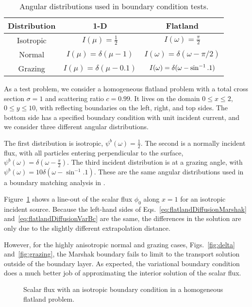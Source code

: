 \begin{table}[htb]
  \centering
  \begin{tabular}{ccc}
\toprule
    Distribution & 1-D & Flatland
\\ \midrule
Isotropic & $I(\mu) = \frac{1}{2}$ & $I(\omega) = \frac{\pi}{2}$
\\
Normal & $I(\mu) = \delta(\mu-1)$ & $I(\omega) = \delta(\omega-\pi/2)$
\\
Grazing & $I(\mu) = \delta(\mu-0.1)$ & $I(\omega) = \delta(\omega-\sin^{-1}.1)$
\\ \bottomrule
  \end{tabular}
  \caption{Angular distributions used in boundary condition tests.}
  \label{tab:angularDistributions}
\end{table}

As a test problem, we consider a homogeneous flatland problem with a
total cross section $\sigma=1$ and scattering ratio $c=0.99$. It lives on the
domain $0 \le x \le 2$, $0 \le y \le 10$, with reflecting boundaries on the left,
right, and top sides. The bottom side has a specified boundary
condition with unit incident current, and we consider three different angular
distributions.

The first distribution is isotropic, $\psi^b(\omega) = \frac{1}{2}$. The second
is a normally incident flux, with all particles entering
perpendicular to the surface, $\psi^b(\omega) = \delta(\omega -
\frac{\pi}{2})$. The third incident distribution is at a grazing angle, with 
$\psi^b(\omega) = 10 \delta(\omega - \sin^{-1}.1)$.
These are the same angular distributions used in a boundary matching analysis
in \cite{Dav2006}.

Figure~\ref{fig:isotropic} shows a line-out of the scalar flux $\phi_0$ along
$x=1$ for an isotropic incident source. Because the left-hand sides of
Eqs.~\eqref{eq:flatlandDiffusionMarshak} and~\eqref{eq:flatlandDiffusionVarBc} are the same, the
differences in the solution are only due to the slightly different
extrapolation distance.

However, for the highly anisotropic normal and grazing cases,
Figs.~\ref{fig:delta} and~\ref{fig:grazing}, the Marshak boundary fails to
limit to the transport solution outside of the boundary layer. As
expected, the variational boundary condition does a much better job of
approximating the interior solution of the scalar flux.

\begin{figure}[htb!]
  \centering\small
  \hspace{-.5in}
  
  \hspace{-.5in}
  \caption{Scalar flux with an isotropic boundary condition in a homogeneous
  flatland problem.}
  \label{fig:isotropic}
\end{figure}

